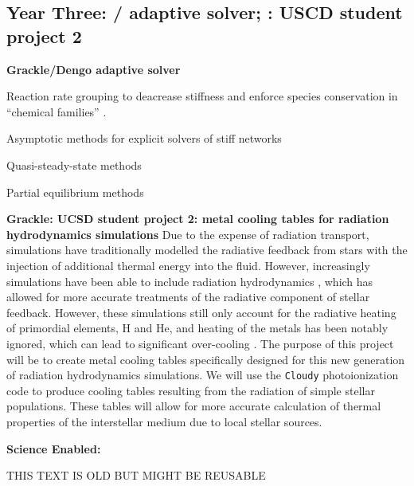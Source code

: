 \subsection{Year Three: \grackle{}/\dengo{} adaptive solver;
  \grackle{}: USCD student project 2}

\noindent \textbf{Grackle/Dengo adaptive solver}

Reaction rate grouping to deacrease stiffness and enforce species
conservation in ``chemical families''
\citep{doi:10.1002/kin.550100907, SANDU19973151}.

Asymptotic methods for explicit solvers of stiff networks
\citep{1749-4699-6-1-015001}

Quasi-steady-state methods \citep{1749-4699-6-1-015002}

Partial equilibrium methods \citep{1749-4699-6-1-015003}

\noindent \textbf{Grackle: UCSD student project 2: metal cooling
  tables for radiation hydrodynamics simulations}
Due to the expense of radiation transport, simulations have
traditionally modelled the radiative feedback from stars with the
injection of additional thermal energy into the fluid.  However,
increasingly simulations have been able to include radiation
hydrodynamics \citep{2012MNRAS.427..311W, Xu_2013, Wise_2014,
  OShea_2015}, which has allowed for more accurate treatments of the
radiative component of stellar feedback.  However, these simulations
still only account for the radiative heating of primordial elements, H
and He, and heating of the metals has been notably ignored, which can
lead to significant over-cooling \citep{2011MNRAS.413..190T,
  2012MNRAS.427..311W}.  The purpose of this project will be to create
metal cooling tables specifically designed for this new generation of
radiation hydrodynamics simulations.  We will use the \texttt{Cloudy}
photoionization code to produce cooling tables resulting from the
radiation of simple stellar populations.  These tables will allow for
more accurate calculation of thermal properties of the interstellar
medium due to local stellar sources.

\textbf{Science Enabled:}

THIS TEXT IS OLD BUT MIGHT BE REUSABLE

